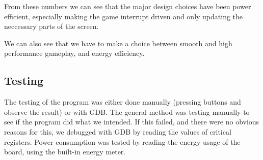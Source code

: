 From these numbers we can see that the major design choices have been power efficient, especially making the game interrupt driven and only updating the neccessary parts of the screen. 

We can also see that we have to make a choice between smooth and high performance gameplay, and energy efficiency. 

 



\subsection{Testing}

The testing of the program was either done manually (pressing buttons and
observe the result) or with GDB. The general method was testing manually
to see if the program did what we intended. If this failed, and there were no
obvious reasons for this, we debugged with GDB by reading the values of critical
registers.
Power consumption was tested by reading the energy usage of the board,
using the built-in energy meter.







